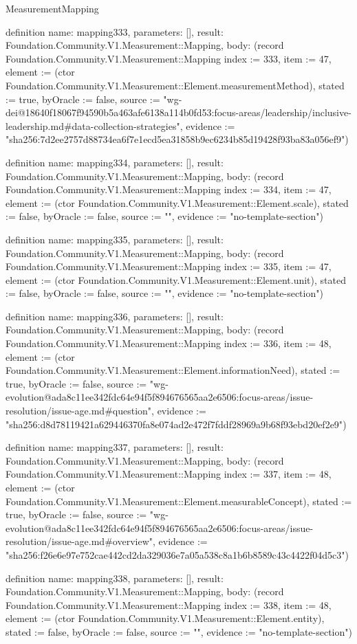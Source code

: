 \begin{lexlean}{MeasurementMapping}
\begin{semanticmodule}
definition{
  name: mapping333,
  parameters: [],
  result: Foundation.Community.V1.Measurement::Mapping,
  body: (record Foundation.Community.V1.Measurement::Mapping {index := 333, item := 47, element := (ctor Foundation.Community.V1.Measurement::Element.measurementMethod), stated := true, byOracle := false, source := "wg-dei@18640f18067f94590b5a463afe6138a114b0fd53:focus-areas/leadership/inclusive-leadership.md#data-collection-strategies", evidence := "sha256:7d2ee2757d88734ea6f7e1ecd5ea31858b9ec6234b85d19428f93ba83a056ef9"})
}

definition{
  name: mapping334,
  parameters: [],
  result: Foundation.Community.V1.Measurement::Mapping,
  body: (record Foundation.Community.V1.Measurement::Mapping {index := 334, item := 47, element := (ctor Foundation.Community.V1.Measurement::Element.scale), stated := false, byOracle := false, source := "", evidence := "no-template-section"})
}

definition{
  name: mapping335,
  parameters: [],
  result: Foundation.Community.V1.Measurement::Mapping,
  body: (record Foundation.Community.V1.Measurement::Mapping {index := 335, item := 47, element := (ctor Foundation.Community.V1.Measurement::Element.unit), stated := false, byOracle := false, source := "", evidence := "no-template-section"})
}

definition{
  name: mapping336,
  parameters: [],
  result: Foundation.Community.V1.Measurement::Mapping,
  body: (record Foundation.Community.V1.Measurement::Mapping {index := 336, item := 48, element := (ctor Foundation.Community.V1.Measurement::Element.informationNeed), stated := true, byOracle := false, source := "wg-evolution@ada8c11ee342fdc64e94f5f894676565aa2e6506:focus-areas/issue-resolution/issue-age.md#question", evidence := "sha256:d8d78119421a629446370fa8e074ad2e472f7fddf28969a9b68f93ebd20ef2e9"})
}

definition{
  name: mapping337,
  parameters: [],
  result: Foundation.Community.V1.Measurement::Mapping,
  body: (record Foundation.Community.V1.Measurement::Mapping {index := 337, item := 48, element := (ctor Foundation.Community.V1.Measurement::Element.measurableConcept), stated := true, byOracle := false, source := "wg-evolution@ada8c11ee342fdc64e94f5f894676565aa2e6506:focus-areas/issue-resolution/issue-age.md#overview", evidence := "sha256:f26e6e97e752cae442cd2da329036e7a05a538c8a1b6b8589c43c4422f04d5c3"})
}

definition{
  name: mapping338,
  parameters: [],
  result: Foundation.Community.V1.Measurement::Mapping,
  body: (record Foundation.Community.V1.Measurement::Mapping {index := 338, item := 48, element := (ctor Foundation.Community.V1.Measurement::Element.entity), stated := false, byOracle := false, source := "", evidence := "no-template-section"})
}


\end{semanticmodule}
\end{lexlean}
